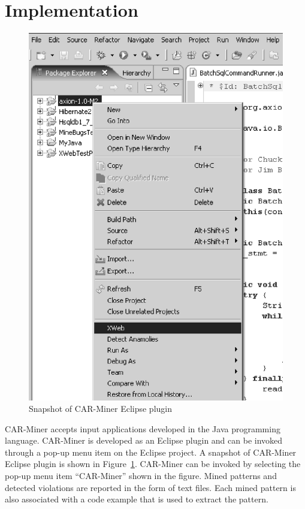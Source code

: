 \section{Implementation}
\label{sec:impl}

\begin{figure}[t]
\centering
\includegraphics[scale=0.40,clip]{figs/eclipseplugin1.eps}
\caption{\label{fig:plugin}Snapshot of CAR-Miner Eclipse plugin} 
\end{figure}

CAR-Miner accepts input applications developed in the Java
programming language. CAR-Miner is developed as an Eclipse plugin
and can be invoked through a pop-up menu item on the Eclipse project.
A snapshot of CAR-Miner Eclipse plugin is shown in Figure~\ref{fig:plugin}.
CAR-Miner can be invoked by selecting the pop-up menu item ``CAR-Miner'' shown 
in the figure. Mined patterns and detected violations are
reported in the form of text files. Each mined pattern is also associated
with a code example that is used to extract the pattern.

